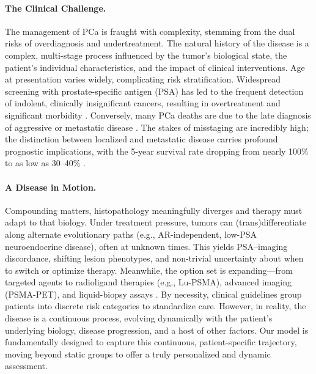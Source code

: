 \documentclass[11pt, a4paper]{article}
\begin{document}
\paragraph{The Clinical Challenge.} The management of PCa is fraught with complexity, stemming from the dual risks of overdiagnosis and undertreatment. The natural history of the disease is a complex, multi-stage process influenced by the tumor’s biological state, the patient’s individual characteristics, and the impact of clinical interventions. Age at presentation varies widely, complicating risk stratification. Widespread screening with prostate-specific antigen (PSA) has led to the frequent detection of indolent, clinically insignificant cancers, resulting in overtreatment and significant morbidity \cite{PadhaniSchoots2023,JenaTaneja2018,CaraccioloCastello2022}. Conversely, many PCa deaths are due to the late diagnosis of aggressive or metastatic disease \cite{PadhaniSchoots2023}. The stakes of misstaging are incredibly high; the distinction between localized and metastatic disease carries profound prognostic implications, with the 5-year survival rate dropping from nearly 100\% to as low as 30–40\% \cite{WangODwyer2024,CereserEvangelista2023}.

\paragraph{A Disease in Motion.} Compounding matters, histopathology meaningfully diverges and therapy must adapt to that biology. Under treatment pressure, tumors can (trans)differentiate along alternate evolutionary paths (e.g., AR-independent, low-PSA neuroendocrine disease), often at unknown times. This yields PSA–imaging discordance, shifting lesion phenotypes, and non-trivial uncertainty about when to switch or optimize therapy. Meanwhile, the option set is expanding—from targeted agents to radioligand therapies (e.g., Lu-PSMA), advanced imaging (PSMA-PET), and liquid-biopsy assays . By necessity, clinical guidelines group patients into discrete risk categories to standardize care. However, in reality, the disease is a continuous process, evolving dynamically with the patient's underlying biology, disease progression, and a host of other factors. Our model is fundamentally designed to capture this continuous, patient-specific trajectory, moving beyond static groups to offer a truly personalized and dynamic assessment.
\end{document}
